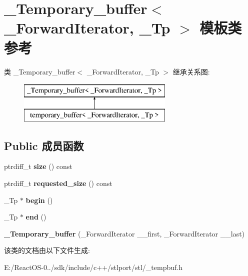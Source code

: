 \hypertarget{class___temporary__buffer}{}\section{\+\_\+\+Temporary\+\_\+buffer$<$ \+\_\+\+Forward\+Iterator, \+\_\+\+Tp $>$ 模板类 参考}
\label{class___temporary__buffer}
类 \+\_\+\+Temporary\+\_\+buffer$<$ \+\_\+\+Forward\+Iterator, \+\_\+\+Tp $>$ 继承关系图\+:\begin{figure}[H]
\begin{center}
\leavevmode
\includegraphics[height=2.000000cm]{class___temporary__buffer}
\end{center}
\end{figure}
\subsection*{Public 成员函数}
\begin{DoxyCompactItemize}
\item 
\mbox{\label{class___temporary__buffer_ab1c795a479d9dd47d0e9862ee8450a84}} 
ptrdiff\+\_\+t {\bfseries size} () const
\item 
\mbox{\label{class___temporary__buffer_ae6bf69a29efc5ba20f816d2ccd3f7d2f}} 
ptrdiff\+\_\+t {\bfseries requested\+\_\+size} () const
\item 
\mbox{\label{class___temporary__buffer_ad2a24905e1c67f71b36cc1a4959866a8}} 
\+\_\+\+Tp $\ast$ {\bfseries begin} ()
\item 
\mbox{\label{class___temporary__buffer_a54e01ac20336e2a1f4d1c3cbf75d2c96}} 
\+\_\+\+Tp $\ast$ {\bfseries end} ()
\item 
\mbox{\label{class___temporary__buffer_a42284f7e05744aa1006976eb11a9434e}} 
{\bfseries \+\_\+\+Temporary\+\_\+buffer} (\+\_\+\+Forward\+Iterator \+\_\+\+\_\+first, \+\_\+\+Forward\+Iterator \+\_\+\+\_\+last)
\end{DoxyCompactItemize}


该类的文档由以下文件生成\+:\begin{DoxyCompactItemize}
\item 
E\+:/\+React\+O\+S-\/0../sdk/include/c++/stlport/stl/\+\_\+tempbuf.\+h\end{DoxyCompactItemize}
